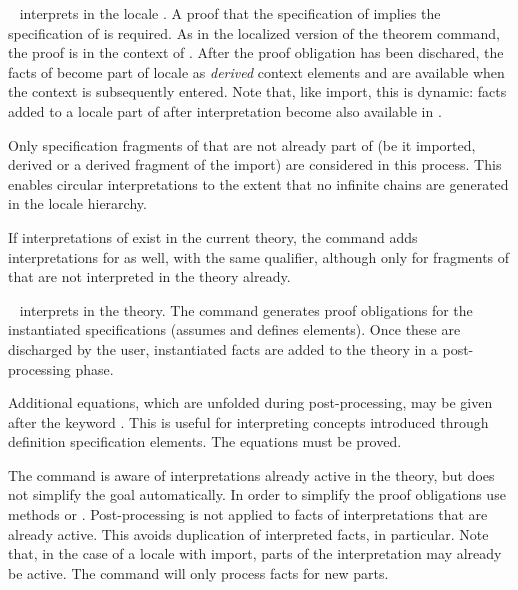 \begin{isabellebody}
\begin{isamarkuptext}
  \begin{description}

  \item \hyperlink{command.sublocale}{\mbox{}}~
  interprets  in the locale .  A proof that
  the specification of  implies the specification of
   is required.  As in the localized version of the
  theorem command, the proof is in the context of .  After
  the proof obligation has been dischared, the facts of 
  become part of locale  as \emph{derived} context
  elements and are available when the context  is
  subsequently entered.  Note that, like import, this is dynamic:
  facts added to a locale part of  after interpretation
  become also available in .

  Only specification fragments of  that are not already
  part of  (be it imported, derived or a derived fragment
  of the import) are considered in this process.  This enables
  circular interpretations to the extent that no infinite chains are
  generated in the locale hierarchy.

  If interpretations of  exist in the current theory, the
  command adds interpretations for  as well, with the same
  qualifier, although only for fragments of  that are not
  interpreted in the theory already.

  \item \hyperlink{command.interpretation}{\mbox{}}~
  interprets  in the theory.  The command generates proof
  obligations for the instantiated specifications (assumes and defines
  elements).  Once these are discharged by the user, instantiated
  facts are added to the theory in a post-processing phase.

  Additional equations, which are unfolded during
  post-processing, may be given after the keyword \hyperlink{keyword.where}{\mbox{}}.
  This is useful for interpreting concepts introduced through
  definition specification elements.  The equations must be proved.

  The command is aware of interpretations already active in the
  theory, but does not simplify the goal automatically.  In order to
  simplify the proof obligations use methods \hyperlink{method.intro-locales}{\mbox{}}
  or \hyperlink{method.unfold-locales}{\mbox{}}.  Post-processing is not applied to
  facts of interpretations that are already active.  This avoids
  duplication of interpreted facts, in particular.  Note that, in the
  case of a locale with import, parts of the interpretation may
  already be active.  The command will only process facts for new
  parts.


\end{description}
\end{isamarkuptext}
\end{isabellebody}
